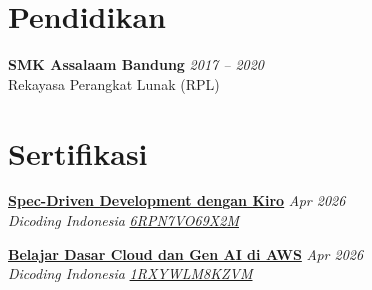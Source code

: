 \documentclass[11pt,a4paper]{article}
\begin{document}
\section*{Pendidikan}
\textbf{SMK Assalaam Bandung} \hfill \textit{2017 -- 2020} \\
Rekayasa Perangkat Lunak (RPL)

\section*{Sertifikasi}

\href{https://dicoding.com/certificates/6RPN7VO69X2M}{\textbf{Spec-Driven Development dengan Kiro}} \hfill \textit{Apr 2026} \\
\textit{Dicoding Indonesia} \hfill \href{https://dicoding.com/certificates/6RPN7VO69X2M}{\textit{6RPN7VO69X2M}}

\vspace{6pt}

\href{https://dicoding.com/certificates/1RXYWLM8KZVM}{\textbf{Belajar Dasar Cloud dan Gen AI di AWS}} \hfill \textit{Apr 2026} \\
\textit{Dicoding Indonesia} \hfill \href{https://dicoding.com/certificates/1RXYWLM8KZVM}{\textit{1RXYWLM8KZVM}}
\end{document}
